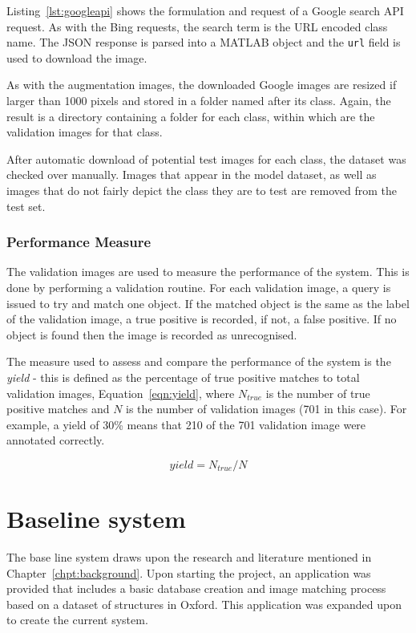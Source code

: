 \documentclass[11pt, onecolumn, a4paper, final]{report} %
\begin{document}
Listing~\ref{lst:googleapi} shows the formulation and request of a Google search API request. As with the Bing requests, the search term is the URL encoded class name. The JSON response is parsed into a MATLAB object and the \lstinline!url! field is used to download the image.

As with the augmentation images, the downloaded Google images are resized if larger than 1000 pixels and stored in a folder named after its class. Again, the result is a directory containing a folder for each class, within which are the validation images for that class.

After automatic download of potential test images for each class, the dataset was checked over manually. Images that appear in the model dataset, as well as images that do not fairly depict the class they are to test are removed from the test set. 

\subsection{Performance Measure}
\label{sub:performance}

The validation images are used to measure the performance of the system. This is done by performing a validation routine. For each validation image, a query is issued to try and match one object. If the matched object is the same as the label of the validation image, a true positive is recorded, if not, a false positive. If no object is found then the image is recorded as unrecognised.

The measure used to assess and compare the performance of the system is the \emph{yield} - this is defined as the percentage of true positive matches to total validation images, Equation~\ref{eqn:yield}, where $N_{true}$ is the number of true positive matches and $N$ is the number of validation images (701 in this case). For example, a yield of 30\% means that 210 of the 701 validation image were annotated correctly.

\begin{equation}
yield = N_{true}/N
\label{eqn:yield}
\end{equation}



\chapter{Baseline system}
\label{chpt:system}
The base line system draws upon the research and literature mentioned in Chapter~\ref{chpt:background}. Upon starting the project, an application was provided that includes a basic database creation and image matching process based on a dataset of structures in Oxford. This application was expanded upon to create the current system.
\end{document}
